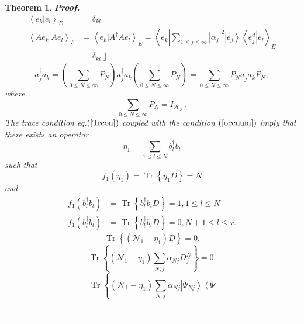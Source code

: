 \documentclass[aps,preprint]{revtex4}%
\newtheorem{theorem}{Theorem}
\newenvironment{proof}[1][Proof]{\noindent\textbf{#1.} }{\ \rule{0.5em}{0.5em}}
\begin{document}
\begin{theorem}
\begin{proof}
\begin{align}
\left\langle \left.  e_{k}\right\vert e_{l}\right\rangle _{E}  &  =\delta
_{kl}\nonumber\\
\left\langle \left.  Ae_{k}\right\vert Ae_{l}\right\rangle _{F}  &
=\left\langle \left.  e_{k}\right\vert A^{\dagger}Ae_{l}\right\rangle
_{E}=\left\langle e_{k}\left\vert \sum_{1\leq j\leq\infty}\left\vert
\alpha_{j}\right\vert ^{2}\left\vert e_{j}\right\rangle \left\langle e_{j}%
^{d}\right\vert e_{l}\right.  \right\rangle _{E}\nonumber\\
&  =\delta_{kl}.\rfloor
\end{align}%
\begin{equation}
a_{j}^{\dagger}a_{k}=\left(  \sum_{0\leq N\leq\infty}P_{N}\right)
a_{j}^{\dagger}a_{k}\left(  \sum_{0\leq N\leq\infty}P_{N}\right)  =\sum_{0\leq
N\leq\infty}P_{N}a_{j}^{\dagger}a_{k}P_{N},
\end{equation}
where%
\begin{equation}
\sum_{0\leq N\leq\infty}P_{N}=I_{\mathcal{H}_{\mathcal{F}}}.
\end{equation}
The trace condition eq.$\left(  \ref{Trcon}\right)  $ coupled with the
condition $\left(  \ref{occnum}\right)  $ imply that there exists an operator
\begin{equation}
\eta_{1}=\sum_{1\leq l\leq N}b_{l}^{\dagger}b_{l}%
\end{equation}
such that
\begin{equation}
f_{1}\left(  \eta_{1}\right)  =\operatorname*{Tr}\left\{  \eta_{1}D\right\}
=N
\end{equation}
and
\begin{align}
f_{1}\left(  b_{l}^{\dagger}b_{l}\right)   &  =\operatorname*{Tr}\left\{
b_{l}^{\dagger}b_{l}D\right\}  =1,1\leq l\leq N\nonumber\\
f_{1}\left(  b_{l}^{\dagger}b_{l}\right)   &  =\operatorname*{Tr}\left\{
b_{l}^{\dagger}b_{l}D\right\}  =0,N+1\leq l\leq r.
\end{align}%
\begin{equation}
\operatorname*{Tr}\left\{  \left(  \mathcal{N}_{1}-\eta_{1}\right)  D\right\}
=0.
\end{equation}%
\begin{equation}
\operatorname*{Tr}\left\{  \left(  \mathcal{N}_{1}-\eta_{1}\right)  \sum
_{N,j}\alpha_{Nj}D_{j}^{N}\right\}  =0.
\end{equation}%
\begin{equation}
\operatorname*{Tr}\left\{  \left(  \mathcal{N}_{1}-\eta_{1}\right)  \sum
_{N,j}\alpha_{Nj}\left\vert \Psi_{Nj}\right\rangle \left\langle \Psi

\end{equation}
\end{proof}
\end{theorem}
\end{document}
